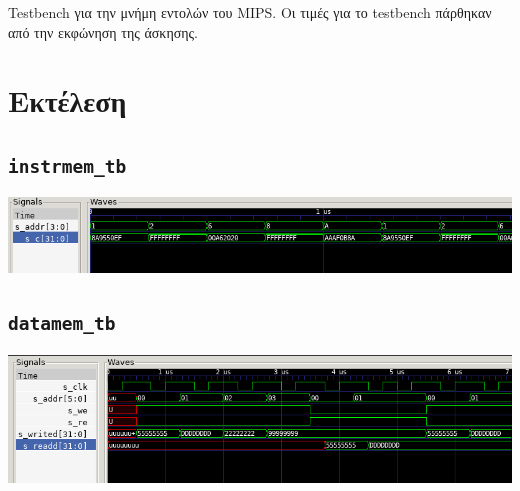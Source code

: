 \documentclass{article}
\begin{document}
Testbench για την μνήμη εντολών του MIPS. Οι τιμές για το testbench πάρθηκαν
από την εκφώνηση της άσκησης. \\


\pagebreak

\section{Εκτέλεση}

\subsection{\lstinline{instrmem_tb}}
\includegraphics[width=\textwidth]{res/instrmem.png}

\subsection{\lstinline{datamem_tb}}
\includegraphics[width=\textwidth]{res/datamem.png}
\end{document}
